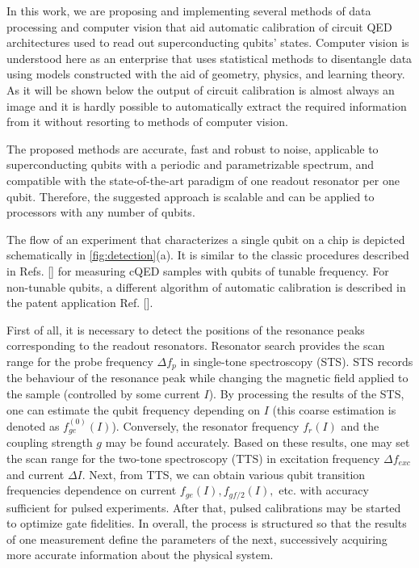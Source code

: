 \documentclass[%
 aip,
 amsmath,amssymb,
 reprint,%
]{revtex4-1}
\begin{document}
In this work, we are proposing and implementing several methods of data processing and computer vision that aid automatic calibration of circuit QED\cite{blais2007} architectures used to read out superconducting qubits' states. Computer vision is understood here as an enterprise that uses statistical methods to disentangle data using models constructed with the aid of geometry, physics, and learning theory\cite{forsyth2011}. As it will be shown below the output of circuit calibration is almost always an image and it is hardly possible to automatically extract the required information from it without resorting to methods of computer vision.

The proposed methods are accurate, fast and robust to noise, applicable to superconducting qubits with a periodic and parametrizable spectrum, and compatible with the state-of-the-art paradigm of one readout resonator per one qubit\cite{versluis2017, kelly2015}. Therefore, the suggested approach is scalable and can be applied to processors with any number of qubits.

The flow of an experiment that characterizes a single qubit on a chip is depicted schematically in \autoref{fig:detection}(a). It is similar to the classic procedures described in Refs. [] for measuring cQED samples with qubits of tunable frequency. For non-tunable qubits, a different algorithm of automatic calibration is described in the patent application Ref. [].

First of all, it is necessary to detect the positions of the resonance peaks corresponding to the readout resonators. Resonator search provides the scan range for the probe frequency $\Delta f_p$ in single-tone spectroscopy (STS). STS records the behaviour of the resonance peak while changing the magnetic field applied to the sample (controlled by some current $I$). By processing the results of the STS, one can estimate the qubit frequency depending on $I$ (this coarse estimation is denoted as  $f^{(0)}_{ge}(I)$). Conversely, the resonator frequency $f_r(I)$ and the coupling strength $g$  may be found accurately. Based on these results, one may set the scan range for the two-tone spectroscopy (TTS) in excitation frequency $\Delta f_{exc}$ and current $\Delta I$. Next, from TTS, we can obtain various qubit transition frequencies dependence on current $f_{ge}(I), f_{gf/2}(I),$ etc. with accuracy sufficient for pulsed experiments.  After that, pulsed calibrations may be started to optimize gate fidelities. In overall, the process is structured so that the results of one measurement define the parameters of the next, successively acquiring more accurate information about the physical system.
\end{document}
